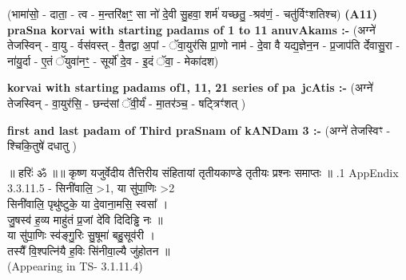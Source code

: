 \documentclass[17pt]{extarticle}
\begin{document}
                  \newline
                      (भामा॑सो॒ - दाता॒ - त्व - म॒न्तरि॑क्षꣳ॒॒ सा नो॑ दे॒वी सु॒हवा॒ शर्म॑ यच्छतु॒ -श्रव॑णं॒ - चतु॑र्विꣳशतिश्च)  \textbf{(A11)} \newline \newline
\textbf{praSna korvai with starting padams of 1 to 11 anuvAkams :-} \newline
(अग्ने॑ तेजस्विन् - वा॒यु - र्वस॑वस्त् - वै॒तद्वा अ॒पां - ॅवा॒युर॑सि प्रा॒णो नाम॑ - दे॒वा वै यद्य॒ज्ञेन॒न - प्र॒जाप॑ति र्देवासु॒रा - ना॑यु॒र्दा - ए॒तं ॅयुवा॑नꣳ॒॒ - सूर्यो॑ दे॒व - इ॒दं ॅवा॒ - मेका॑दश) \newline

\textbf{korvai with starting padams of1, 11, 21 series of pa~jcAtis :-} \newline
(अग्ने॑ तेजस्विन् - वा॒युर॑सि॒ - छन्द॑सां ॅवी॒र्यं॑ - मा॒तर॑ञ्च॒ - षट्त्रिꣳ॑शत् ) \newline

\textbf{first and last padam of Third praSnam of kANDam 3 :-} \newline
(अग्ने॑ तेजस्विꣳ - श्चिकि॒तुषे॑ दधातु ) \newline 


॥ हरिः॑ ॐ ॥॥ कृष्ण यजुर्वेदीय तैत्तिरीय संहितायां तृतीयकाण्डे तृतीयः प्रश्नः समाप्तः ॥ \newline
{}.1   AppEndix\\3.3.11.5 - सिनी॑वालि॒ >1, या सु॑पा॒णिः >2\\सिनी॑वालि॒ पृथु॑ष्टुके॒ या दे॒वाना॒मसि॒ स्वसा᳚ । \\जु॒षस्व॑ ह॒व्य माहु॑तं प्र॒जां दे॑वि दिदिड्ढि नः ॥\\या सु॑पा॒णिः स्व॑ङ्गु॒रिः सु॒षूमा॑ बहु॒सूव॑री । \\तस्यै᳚ वि॒श्पत्नि॑यै ह॒विः सि॑नीवा॒ल्यै जु॑होतन ॥ \\(Appearing in TS- 3.1.11.4)\\
\pagebreak
        
\end{document}
